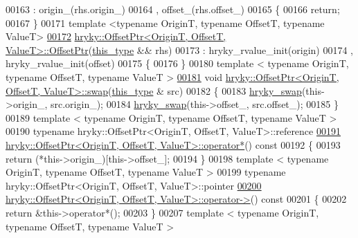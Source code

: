 \begin{DoxyCode}
00163     : origin\_(rhs.origin\_)
00164       , offset\_(rhs.offset\_)
00165 \{
00166     \textcolor{keywordflow}{return};
00167 \}
00171 \textcolor{keyword}{template} <\textcolor{keyword}{typename} OriginT, \textcolor{keyword}{typename} OffsetT, \textcolor{keyword}{typename} ValueT>
\hypertarget{offset__ptr_8h_source_l00172}{}\hyperlink{classhryky_1_1_offset_ptr_a9aaecfa667ed21310eaa0e9a8c37441e}{00172} \hyperlink{classhryky_1_1_offset_ptr}{hryky::OffsetPtr<OriginT, OffsetT, ValueT>::OffsetPtr}(\hyperlink{classhryky_1_1_offset_ptr}{this_type} && rhs)
00173     : hryky\_rvalue\_init(origin)
00174       , hryky\_rvalue\_init(offset)
00175 \{
00176 \}
00180 \textcolor{keyword}{template} < \textcolor{keyword}{typename} OriginT, \textcolor{keyword}{typename} OffsetT, \textcolor{keyword}{typename} ValueT >
\hypertarget{offset__ptr_8h_source_l00181}{}\hyperlink{classhryky_1_1_offset_ptr_ac1e20ff0f8e5ea1511abb6d6ed7745c2}{00181} \textcolor{keywordtype}{void} \hyperlink{namespacehryky_a4282146df5ea2b68cb667896a2205909}{hryky::OffsetPtr<OriginT, OffsetT, ValueT>::swap}(\hyperlink{classhryky_1_1_offset_ptr}{this_type} & src)
00182 \{
00183     \hyperlink{namespacehryky_add9c1c1fdfda07cd47bcb7c16d3a823a}{hryky_swap}(this->origin\_, src.origin\_);
00184     \hyperlink{namespacehryky_add9c1c1fdfda07cd47bcb7c16d3a823a}{hryky_swap}(this->offset\_, src.offset\_);
00185 \}
00189 \textcolor{keyword}{template} < \textcolor{keyword}{typename} OriginT, \textcolor{keyword}{typename} OffsetT, \textcolor{keyword}{typename} ValueT >
00190 \textcolor{keyword}{typename} hryky::OffsetPtr<OriginT, OffsetT, ValueT>::reference
\hypertarget{offset__ptr_8h_source_l00191}{}\hyperlink{classhryky_1_1_offset_ptr_aa5d3baf87f43bdda50d53b385aad65d9}{00191} \hyperlink{classhryky_1_1_offset_ptr}{hryky::OffsetPtr<OriginT, OffsetT, ValueT>::operator*}()\textcolor{keyword}{ const}
00192 \textcolor{keyword}{}\{
00193     \textcolor{keywordflow}{return} (*this->origin\_)[this->offset\_];
00194 \}
00198 \textcolor{keyword}{template} < \textcolor{keyword}{typename} OriginT, \textcolor{keyword}{typename} OffsetT, \textcolor{keyword}{typename} ValueT >
00199 \textcolor{keyword}{typename} hryky::OffsetPtr<OriginT, OffsetT, ValueT>::pointer
\hypertarget{offset__ptr_8h_source_l00200}{}\hyperlink{classhryky_1_1_offset_ptr_a8133720280b2eb94840e772e983a0620}{00200} \hyperlink{classhryky_1_1_offset_ptr}{hryky::OffsetPtr<OriginT, OffsetT, ValueT>::operator->}()\textcolor{keyword}{ const}
00201 \textcolor{keyword}{}\{
00202     \textcolor{keywordflow}{return} &this->operator*();
00203 \}
00207 \textcolor{keyword}{template} < \textcolor{keyword}{typename} OriginT, \textcolor{keyword}{typename} OffsetT, \textcolor{keyword}{typename} ValueT >

\end{DoxyCode}
